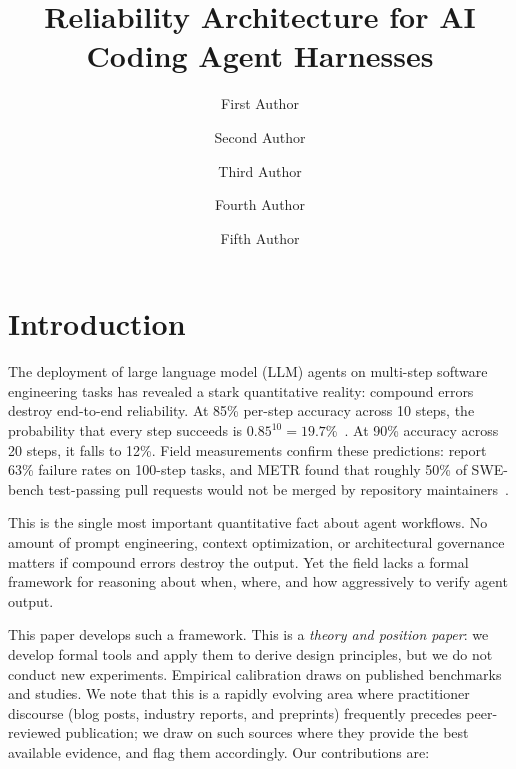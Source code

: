 \documentclass[11pt, a4paper, logo, copyright]{googledeepmind}
\title{Reliability Architecture for AI Coding Agent Harnesses}
\author[1]{First Author}
\author[2]{Second Author}
\author[2]{Third Author}
\author[1]{Fourth Author}
\author[1]{Fifth Author}
\affil[]{Pragnition Labs}
\affil[*]{Equal Contribution}
\affil[1]{Affiliation 1}
\affil[2]{Affiliation 2}
\begin{document}
\maketitle

\section{Introduction}
\label{sec:intro}

The deployment of large language model (LLM) agents on multi-step software engineering tasks has revealed a stark quantitative reality: compound errors destroy end-to-end reliability.
At 85\% per-step accuracy across 10 steps, the probability that every step succeeds is $0.85^{10} = 19.7\%$~\citep{rajan2026math}.
At 90\% accuracy across 20 steps, it falls to 12\%.
Field measurements confirm these predictions: \citet{hariharan2025plan} report 63\% failure rates on 100-step tasks, and METR found that roughly 50\% of SWE-bench test-passing pull requests would not be merged by repository maintainers~\citep{metr2026swebench}.

This is the single most important quantitative fact about agent workflows.
No amount of prompt engineering, context optimization, or architectural governance matters if compound errors destroy the output.
Yet the field lacks a formal framework for reasoning about when, where, and how aggressively to verify agent output.

This paper develops such a framework. This is a \emph{theory and position paper}: we develop formal tools and apply them to derive design principles, but we do not conduct new experiments. Empirical calibration draws on published benchmarks and studies. We note that this is a rapidly evolving area where practitioner discourse (blog posts, industry reports, and preprints) frequently precedes peer-reviewed publication; we draw on such sources where they provide the best available evidence, and flag them accordingly. Our contributions are:
\end{document}

